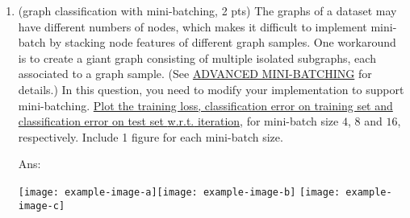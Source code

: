 \documentclass[10pt]{article}
\newcommand{\ans}[1]{{\color{blue}\textsf{Ans}: #1}}
\newcommand{\wrt}{{w.r.t.}\xspace}
\begin{document}
\begin{exercise}
\begin{enumerate}
		 \ans{%
		 
		 \texttt{[image: example-image-a]}\texttt{[image: example-image-b]}
		 }
		 
		 \item (graph classification with mini-batching, 2 pts) The graphs of a dataset may have different numbers of nodes, which makes it difficult to implement mini-batch by stacking node features of different graph samples. One workaround is to create a giant graph consisting of multiple isolated subgraphs, each associated to a graph sample. (See \href{https://pytorch-geometric.readthedocs.io/en/latest/notes/batching.html}{ADVANCED MINI-BATCHING} for details.) In this question, you need to modify your implementation to support mini-batching. \uline{Plot the training loss, classification error on training set and classification error on test set \wrt iteration}, for mini-batch size $4$, $8$ and $16$, respectively. Include 1 figure for each mini-batch size. 
		 
		 \ans{%
		 
		 \texttt{[image: example-image-a]}\texttt{[image: example-image-b]}
		 \texttt{[image: example-image-c]}
		 }
		\end{enumerate}
	\end{exercise}
\end{document}
